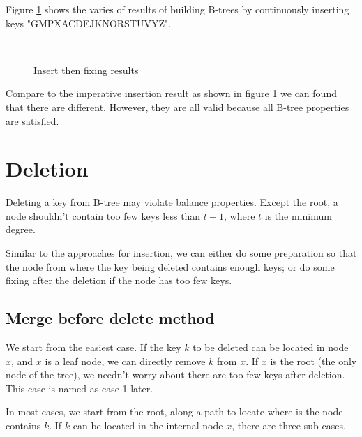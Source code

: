 \documentclass{article}
\begin{document}
Figure \ref{fig:btree-insert-fp} shows the varies of results of building B-trees
by continuously inserting keys "GMPXACDEJKNORSTUVYZ".

\begin{figure}[htbp]
  \centering
   \\
    \caption{Insert then fixing results} \label{fig:btree-insert-fp}
\end{figure}

Compare to the imperative insertion result
as shown in figure \ref{fig:btree-insert-fp}
we can found that there are different. However, they are all valid
because all B-tree properties
are satisfied.


\section{Deletion}

Deleting a key from
B-tree may violate balance properties. Except the root, a node shouldn't
contain too few keys less than $t-1$, where $t$ is the
minimum degree.

Similar to the approaches for insertion, we can either do some preparation
so that the node from where the key being deleted contains enough
keys; or do some fixing after the deletion if the node has too few keys.


\subsection{Merge before delete method}

We start from the easiest case. If the key $k$ to be deleted
can be located in node $x$, and $x$ is a leaf node,
we can directly remove $k$ from $x$. If $x$ is the root (the only
node of the tree), we needn't worry about there are too few
keys after deletion. This case is named as case 1 later.

In most cases, we start from the root, along a path to locate
where is the node contains $k$. If $k$ can be located in the
internal node $x$, there are three sub cases.
\end{document}
